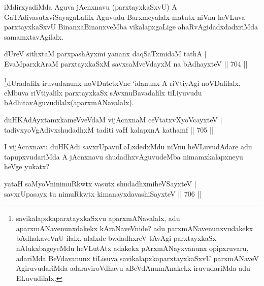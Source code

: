 \begin{artha}
iMdirxyadiMda Aguva jAcnxnavu (parxtayxkaSxvU) A GaTAdivasutxviSayagaLalilx Aguvudu Barxmeyalalx matutx niVnu heVLuva parxtayxkaSxvU BinanxaBinanxveMba vikalapxgaLige ahaRvAgidadxdadxriMda samamxtavAgilalx.
\end{artha}


\begin{shl}
dUreV sithxtaM parxpashAyxmi yananx daqSaTxmidaM tathA | \\
EvaMparxkAraM parxtayxkaSxM savxsaMveVdayxM na bAdhayxteV \hfill||  704 ||  
\end{shl}

\begin{artha}
\footnote{savikalapxkaparxtayxkaSxvu aparxmANavalalx, adu  aparxmANavenunxdakekx kAraNaveVnide? adu parxmANavenunxvudakekx bAdhakaveVnU ilalx. alalxde bwdadhxreV tAvAgi parxtayxkaSx nAlukxbageyeMdu heVLutAtx adakekx pArxmANayxvanunx opipxruvaru, adariMda BeVdavanunx tiLisuva savikalapxkaparxtayxkaSxvU parxmANaveV AgiruvudariMda adaraviroVdhavu aBeVdAnumAnakekx iruvudariMda adu ELuvudilalx.}dUradalilx iruvudanunx noVDutetxVne `idanunx A riVtiyAgi noVDalilalx, eMbuva riVtiyalilx parxtayxkaSx sAvxnuBavadalilx tiLiyuvudu bAdhitavAguvudilalx(aparxmANavalalx).
\end{artha}


\begin{shl}
duHKAdAyxtamxkameVveVdaM vijAcnxnaM ceVtatxvXyoVcayxteV | \\
tadivxyoVgAdivxshudadhxM taditi vaH kalapxnA kathamf \hfill||  705 ||  
\end{shl}

\begin{artha}
I vijAcnxnavu duHKAdi savxrUpavuLaLxdedxMdu niVnu heVLuvudAdare adu tapupxvudariMda A jAcnxnavu shudadhxvAguvudeMba nimamxkalapxneyu heVge yukatx?
\end{artha}


\begin{shl}
yataH saMyoVninimuRkwtx vasutx shudadhxmiheVSayxteV | \\
savxrUpasayx tu nimuRkwtx kimanayxdavashiSayxteV \hfill||  706 ||  
\end{shl}

